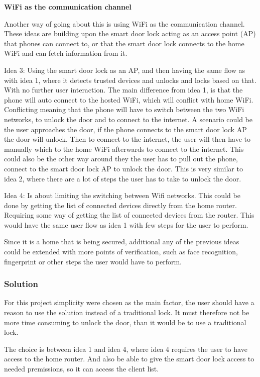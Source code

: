 \textbf{WiFi as the communication channel}

Another way of going about this is using WiFi as the communication channel.
These ideas are building upon the smart door lock acting as an access point (AP) that phones can connect to, or that the smart door lock connects to the home WiFi and can fetch information from it.

Idea 3: Using the smart door lock as an AP, and then having the same flow as with idea 1, where it detects trusted devices and unlocks and locks based on that. With no further user interaction.
The main difference from idea 1, is that the phone will auto connect to the hosted WiFi, which will conflict with home WiFi.
Conflicting meaning that the phone will have to switch between the two WiFi networks, to unlock the door and to connect to the internet.
A scenario could be the user approaches the door, if the phone connects to the smart door lock AP the door will unlock.
Then to connect to the internet, the user will then have to manually which to the home WiFi afterwards to connect to the internet.
This could also be the other way around they the user has to pull out the phone, connect to the smart door lock AP to unlock the door.
This is very similar to idea 2, where there are a lot of steps the user has to take to unlock the door.

Idea 4: Is about limiting the switching between Wifi networks.
This could be done by getting the list of connected devices directly from the home router.
Requiring some way of getting the list of connected devices from the router.
This would have the same user flow as idea 1 with few steps for the user to perform.

Since it is a home that is being secured, additional any of the previous ideas could be extended with more points of verification, such as face recognition, fingerprint or other steps the user would have to perform.

\subsubsection{Solution}
For this project simplicity were chosen as the main factor, the user should have a reason to use the solution instead of a traditional lock.
It must therefore not be more time consuming to unlock the door, than it would be to use a traditional lock.

The choice is between idea 1 and idea 4, where idea 4 requires the user to have access to the home router.
And also be able to give the smart door lock access to needed premissions, so it can access the client list.

